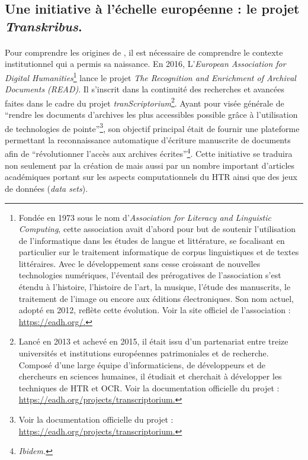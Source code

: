 \documentclass[a4paper,12pt,twoside]{book}
\begin{document}
\subsection{Une initiative à l'échelle européenne : le projet \textit{Transkribus}.}

\paragraph{}
Pour comprendre les origines de , il est nécessaire de comprendre le contexte institutionnel qui a permis sa naissance. En 2016, L'\textit{European Association for Digital Humanities}\footnote{Fondée en 1973 sous le nom d'\textit{Association for Literacy and Linguistic Computing}, cette association avait d'abord pour but de soutenir l'utilisation de l'informatique dans les études de langue et littérature, se focalisant en particulier sur le traitement informatique de corpus linguistiques et de textes littéraires. Avec le développement sans cesse croissant de nouvelles technologies numériques, l'éventail des prérogatives de l'association s'est étendu à l'histoire, l'histoire de l'art, la musique, l'étude des manuscrits, le traitement de l'image ou encore aux éditions électroniques. Son nom actuel, adopté en 2012, reflète cette évolution. Voir la site officiel de l'association : \url{https://eadh.org/.}} lance le projet \textit{The Recognition and Enrichment of Archival Documents (READ)}. Il s'inscrit dans la continuité des recherches et avancées faites dans le cadre du projet \textit{tranScriptorium}\footnote{ Lancé en 2013 et achevé en 2015, il était issu d'un partenariat entre treize universités et institutions européennes patrimoniales et de recherche. Composé d'une large équipe d'informaticiens, de développeurs et de chercheurs en sciences humaines, il étudiait et cherchait à développer les techniques de HTR et OCR. Voir la documentation officielle du projet : \url{https://eadh.org/projects/transcriptorium.}}. Ayant pour visée générale de \enquote{rendre les documents d’archives les plus accessibles possible grâce à l’utilisation de technologies de pointe}\footnote{Voir la documentation officielle du projet : \url{https://eadh.org/projects/transcriptorium.}}, son objectif principal était de fournir une plateforme permettant la reconnaissance automatique d’écriture manuscrite de documents afin de \enquote{révolutionner l’accès aux archives écrites}\footnote{\textit{Ibidem.}}. Cette initiative se traduira non seulement par la création de  mais aussi par un nombre important d’articles académiques portant sur les aspects computationnels du HTR ainsi que des jeux de données (\textit{data sets}). 
\end{document}
